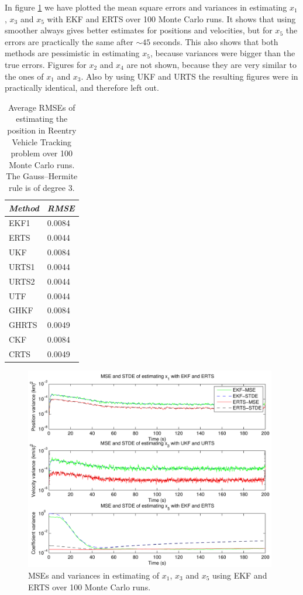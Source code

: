 In figure \ref{fig:reentry_errors} we have plotted the mean square
errors and variances in estimating $x_1$, $x_3$ and $x_5$ with EKF and
ERTS over 100 Monte Carlo runs. It shows that using smoother always
gives better estimates for positions and velocities, but for $x_5$ the
errors are practically the same after $\sim 45$ seconds. This also
shows that both methods are pessimistic in estimating $x_5$, because
variances were bigger than the true errors. Figures for $x_2$ and
$x_4$ are not shown, because they are very similar to the ones of
$x_1$ and $x_3$. Also by using UKF and URTS the resulting figures were
in practically identical, and therefore left out.
% 
%  
\begin{table}
\begin{center}
\begin{tabular}{|l|l|} \hline {\it Method}&{\it RMSE } \\ \hline
 EKF1  & 0.0084 \\ 
 ERTS  & 0.0044 \\ 
 UKF   & 0.0084 \\ 
 URTS1 & 0.0044 \\ 
 URTS2 & 0.0044 \\ 
 UTF   & 0.0044 \\
 GHKF  & 0.0084 \\
 GHRTS & 0.0049 \\
 CKF   & 0.0084 \\
 CRTS  & 0.0049 \\
 \hline
\end{tabular}
\caption{Average RMSEs of estimating the position in Reentry Vehicle
Tracking problem over 100 Monte Carlo runs. The Gauss--Hermite rule is
of degree 3.}
\label{table:reentry_rmse}
\end{center}
\end{table}
%
\begin{figure}
\begin{center}
\includegraphics[width=11cm]{pics/reentry_errors}
\caption{MSEs and variances in estimating of $x_1$, $x_3$ and $x_5$
using EKF and ERTS over 100 Monte Carlo runs.}
\label{fig:reentry_errors}
\end{center}
\end{figure}


